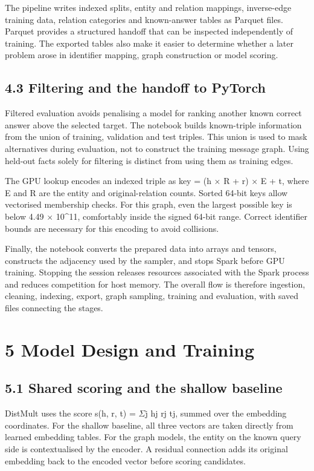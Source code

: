 \documentclass[11pt]{article}
\begin{document}
The pipeline writes indexed splits, entity and relation mappings, inverse-edge training data, relation categories and known-answer tables as Parquet files. Parquet provides a structured handoff that can be inspected independently of training. The exported tables also make it easier to determine whether a later problem arose in identifier mapping, graph construction or model scoring.

\subsection*{4.3 Filtering and the handoff to PyTorch}
Filtered evaluation avoids penalising a model for ranking another known correct answer above the selected target. The notebook builds known-triple information from the union of training, validation and test triples. This union is used to mask alternatives during evaluation, not to construct the training message graph. Using held-out facts solely for filtering is distinct from using them as training edges.

The GPU lookup encodes an indexed triple as key = (h $\times$ R + r) $\times$ E + t, where E and R are the entity and original-relation counts. Sorted 64-bit keys allow vectorised membership checks. For this graph, even the largest possible key is below 4.49 $\times$ 10\textasciicircum{}11, comfortably inside the signed 64-bit range. Correct identifier bounds are necessary for this encoding to avoid collisions.

Finally, the notebook converts the prepared data into arrays and tensors, constructs the adjacency used by the sampler, and stops Spark before GPU training. Stopping the session releases resources associated with the Spark process and reduces competition for host memory. The overall flow is therefore ingestion, cleaning, indexing, export, graph sampling, training and evaluation, with saved files connecting the stages.

\section*{5 Model Design and Training}
\subsection*{5.1 Shared scoring and the shallow baseline}
DistMult uses the score s(h, r, t) = $\Sigma$j hj rj tj, summed over the embedding coordinates. For the shallow baseline, all three vectors are taken directly from learned embedding tables. For the graph models, the entity on the known query side is contextualised by the encoder. A residual connection adds its original embedding back to the encoded vector before scoring candidates.
\end{document}
